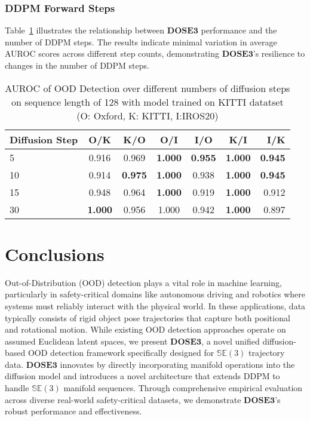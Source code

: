 \subsubsection{DDPM Forward Steps}
Table~\ref{tab:ablation_steps} illustrates the relationship between $\mathbf{DOSE3}$ performance and the number of DDPM steps. The results indicate minimal variation in average AUROC scores across different step counts, demonstrating $\mathbf{DOSE3}$'s resilience to changes in the number of DDPM steps.
\begin{table}[t]
\caption{AUROC of OOD Detection over different numbers of diffusion steps on sequence length of 128 with model trained on KITTI datatset\\
(O: Oxford, K: KITTI, I:IROS20)}
    \vskip 0.15in
    \begin{adjustbox}{width=0.68\linewidth,center}
    \begin{tabular}{lcccccr}
    \toprule
        \textbf{Diffusion Step} & \textbf{O/K} & \textbf{K/O} & \textbf{O/I} & \textbf{I/O} & \textbf{K/I} & \textbf{I/K}\\
    \midrule
        5   & 0.916 & 0.969 & \textbf{1.000} & \textbf{0.955} & \textbf{1.000} & \textbf{0.945}\\
        10  & 0.914 & \textbf{0.975} & \textbf{1.000} & 0.938 & \textbf{1.000} & \textbf{0.945}\\
        15  & 0.948 & 0.964 & \textbf{1.000} & 0.919 & \textbf{1.000} & 0.912\\
        30  & \textbf{1.000} & 0.956 & 1.000 & 0.942 & \textbf{1.000} & 0.897\\
    \bottomrule
    \end{tabular}
    \end{adjustbox}
    \vskip -0.1in
    
    \label{tab:ablation_steps}
\end{table}

\section{Conclusions}
Out-of-Distribution (OOD) detection plays a vital role in machine learning, particularly in safety-critical domains like autonomous driving and robotics where systems must reliably interact with the physical world. In these applications, data typically consists of rigid object pose trajectories that capture both positional and rotational motion. While existing OOD detection approaches operate on assumed Euclidean latent spaces, we present $\mathbf{DOSE3}$, a novel unified diffusion-based \ac{OOD} detection framework specifically designed for $\mathbb{SE}(3)$ trajectory data.
$\mathbf{DOSE3}$ innovates by directly incorporating manifold operations into the diffusion model and introduces a novel architecture that extends DDPM to handle $\mathbb{SE}(3)$ manifold sequences. Through comprehensive empirical evaluation across diverse real-world safety-critical datasets, we demonstrate $\mathbf{DOSE3}$'s robust performance and effectiveness.
